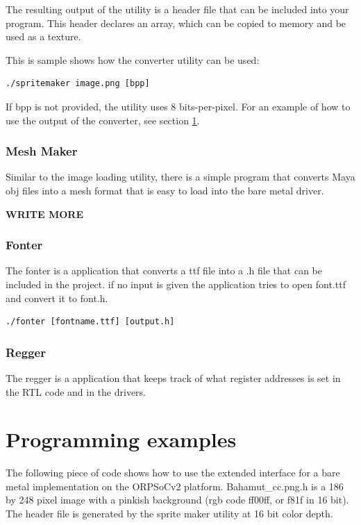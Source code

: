 \documentclass[10pt,a4paper]{article}
\begin{document}
The resulting output of the utility is a header file that can be included into your program. This header declares an array, which can be copied to memory and be used as a texture.

This is sample shows how the converter utility can be used:

\begin{lstlisting}
./spritemaker image.png [bpp]
\end{lstlisting}

If bpp is not provided, the utility uses 8 bits-per-pixel. For an example of how to use the output of the converter, see section \ref{sec:examples}.

\subsubsection{Mesh Maker}
Similar to the image loading utility, there is a simple program that converts Maya obj files into a mesh format that is easy to load into the bare metal driver.

\textbf{WRITE MORE}
\subsubsection{Fonter}
The fonter is a application that converts a ttf file into a .h file that can be included in the project. if no input is given the application tries to open font.ttf and convert it to font.h.

\begin{lstlisting}
./fonter [fontname.ttf] [output.h]
\end{lstlisting}

\subsubsection{Regger}
The regger is a application that keeps track of what register addresses is set in the RTL code and in the drivers.

\section{Programming examples}
\label{sec:examples}
The following piece of code shows how to use the extended interface for a bare metal implementation on the ORPSoCv2 platform. Bahamut\_cc.png.h is a 186 by 248 pixel image with a pinkish background (rgb code ff00ff, or f81f in 16 bit). The header file is generated by the sprite maker utility at 16 bit color depth.
\end{document}
